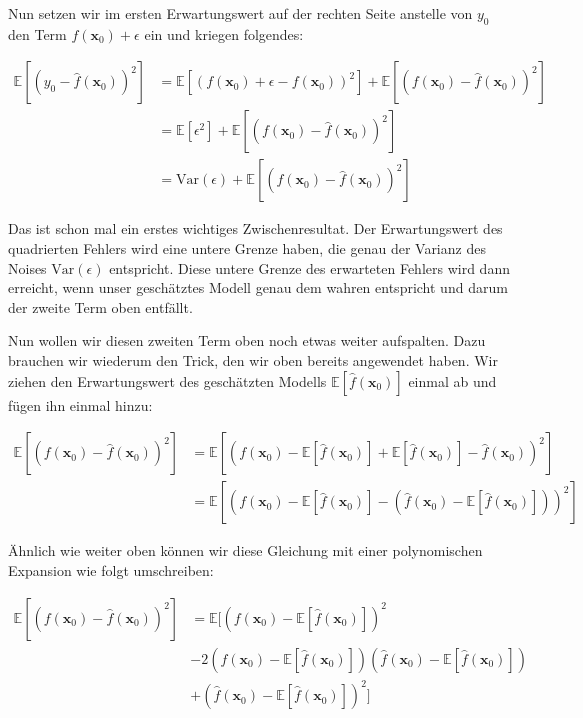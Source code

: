 \documentclass[
]{book}
\begin{document}
Nun setzen wir im ersten Erwartungswert auf der rechten Seite anstelle von \(y_0\) den Term \(f(\mathbf{x}_0) + \epsilon\) ein und kriegen folgendes:

\begin{align}
\mathbb{E}\left[\left(y_0 - \hat{f}(\mathbf{x}_0)\right)^2\right] &= \mathbb{E}\left[\left(f(\mathbf{x}_0) + \epsilon - f(\mathbf{x}_0)\right)^2\right] + \mathbb{E}\left[(f(\mathbf{x}_0) - \hat{f}(\mathbf{x}_0))^2\right] \\
&= \mathbb{E}\left[\epsilon^2\right] + \mathbb{E}\left[(f(\mathbf{x}_0) - \hat{f}(\mathbf{x}_0))^2\right] \\
&= \text{Var}(\epsilon) + \mathbb{E}\left[(f(\mathbf{x}_0) - \hat{f}(\mathbf{x}_0))^2\right]
\end{align}

Das ist schon mal ein erstes wichtiges Zwischenresultat. Der Erwartungswert des quadrierten Fehlers wird eine untere Grenze haben, die genau der Varianz des Noises \(\text{Var}(\epsilon)\) entspricht. Diese untere Grenze des erwarteten Fehlers wird dann erreicht, wenn unser geschätztes Modell genau dem wahren entspricht und darum der zweite Term oben entfällt.

Nun wollen wir diesen zweiten Term oben noch etwas weiter aufspalten. Dazu brauchen wir wiederum den Trick, den wir oben bereits angewendet haben. Wir ziehen den Erwartungswert des geschätzten Modells \(\mathbb{E}\left[\hat{f}(\mathbf{x}_0)\right]\) einmal ab und fügen ihn einmal hinzu:

\begin{align}
\mathbb{E}\left[(f(\mathbf{x}_0) - \hat{f}(\mathbf{x}_0))^2\right] &= \mathbb{E}\left[\left(f(\mathbf{x}_0) - \mathbb{E}\left[\hat{f}(\mathbf{x}_0)\right] + \mathbb{E}\left[\hat{f}(\mathbf{x}_0)\right] - \hat{f}(\mathbf{x}_0)\right)^2\right] \\
&= \mathbb{E}\left[\left(f(\mathbf{x}_0) - \mathbb{E}\left[\hat{f}(\mathbf{x}_0)\right] - \left(\hat{f}(\mathbf{x}_0) - \mathbb{E}\left[\hat{f}(\mathbf{x}_0)\right]\right)\right)^2\right]
\end{align}

Ähnlich wie weiter oben können wir diese Gleichung mit einer polynomischen Expansion wie folgt umschreiben:

\begin{align}
\mathbb{E}\left[(f(\mathbf{x}_0) - \hat{f}(\mathbf{x}_0))^2\right] &= \mathbb{E}\biggl[\left(f(\mathbf{x}_0) - \mathbb{E}\left[\hat{f}(\mathbf{x}_0)\right]\right)^2 \\ 
&- 2\left(f(\mathbf{x}_0) - \mathbb{E}\left[\hat{f}(\mathbf{x}_0)\right]\right)\left(\hat{f}(\mathbf{x}_0) - \mathbb{E}\left[\hat{f}(\mathbf{x}_0)\right]\right) \\
&+ \left(\hat{f}(\mathbf{x}_0) - \mathbb{E}\left[\hat{f}(\mathbf{x}_0)\right]\right)^2\biggr]
\end{align}
\end{document}
